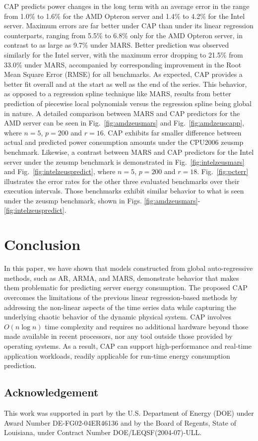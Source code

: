 \documentclass[times,10pt,finalversion]{usetex-v1}
\renewcommand{\figurename}{Fig.}
\begin{document}
CAP predicts power changes in the long term with an average error in the
range from 1.0\% to 1.6\% for the AMD Opteron server and 1.4\% to 4.2\%
for the Intel server.  Maximum errors are far better under CAP than
under its linear regression counterparts, ranging from 5.5\% to 6.8\%
only for the AMD Opteron server, in contrast to as large as 9.7\% under
MARS.  Better prediction was observed similarly for the Intel server,
with the maximum error dropping to 21.5\% from 33.0\% under MARS,
accompanied by corresponding improvement in the Root Mean Square Error
(RMSE) for all benchmarks.  As expected, CAP provides a better fit
overall and at the start as well as the end of the series.  This
behavior, as opposed to a regression spline technique like MARS, results
from better prediction of piecewise local polynomials versus the
regression spline being global in nature. A detailed comparison between
MARS and CAP predictors for the AMD server can be seen in
\figurename~\ref{fig:amdzeusmars} and \figurename~\ref{fig:amdzeuscapp},
where $n=5$, $p=200$ and $r=16$. CAP exhibits far smaller difference
between actual and predicted power consumption amounts under the CPU2006
zeusmp benchmark.  Likewise, a contrast between MARS and CAP predictors
for the Intel server under the zeusmp benchmark is demonstrated in
\figurename~\ref{fig:intelzeusmars} and
\figurename~\ref{fig:intelzeuspredict}, where $n=5$, $p=200$ and $r=18$.
\figurename~\ref{fig:pcterr} illustrates the error rates for the other
three evaluated benchmarks over their execution intervals.  Those
benchmarks exhibit similar behavior to what is seen under the zeusmp
benchmark, shown in
Figs. \ref{fig:amdzeusmars}-\ref{fig:intelzeuspredict}.
\section{Conclusion}
\label{sec:conclusions}
In this paper, we have shown that models constructed from global
auto-regressive methods, such as AR, ARMA, and MARS, demonstrate
behavior that makes them problematic for predicting server energy
consumption.  The proposed CAP overcomes the limitations of the
previous linear regression-based methods by addressing the non-linear
aspects of the time series data while capturing the underlying chaotic
behavior of the dynamic physical system.  CAP involves $O(n\log{n})$
time complexity and requires no additional hardware beyond those made
available in recent processors, nor any tool outside those provided by
operating systems. As a result, CAP can support high-performance and
real-time application workloads, readily applicable for run-time energy
consumption prediction.  
\begin{small}
\section*{Acknowledgement}
This work was supported in part by the U.S. Department of Energy (DOE)
under Award Number DE-FG02-04ER46136 and by the Board of Regents, State
of Louisiana, under Contract Number DOE/LEQSF(2004-07)-ULL.
\end{small}
\label{sec:references} 
\begin{small}

  
\end{small}
\end{document}
